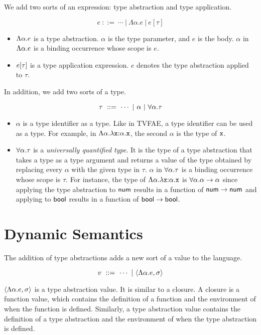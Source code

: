 We add two sorts of an expression: type abstraction and type application.

\[ e\ ::=\ \cdots \ |\ \Lambda\alpha.e \ |\ e[\tau] \]

\begin{itemize}
  \item $\Lambda\alpha.e$ is a type abstraction. $\alpha$ is the type
    parameter, and $e$ is the body. $\alpha$ in $\Lambda\alpha.e$
    is a binding occurrence whose scope is $e$.
  \item $e[\tau]$ is a type application expression. $e$ denotes the type
    abstraction applied to $\tau$.
\end{itemize}

In addition, we add two sorts of a type.

\[ \tau\ ::=\ \cdots \ |\ \alpha \ |\ \tforall{\alpha}{\tau} \]

\begin{itemize}
  \item $\alpha$ is a type identifier as a type. Like in \textsf{TVFAE}, a
    type identifier can be used as a type.
    For example, in $\Lambda\alpha.\lambda\texttt{x}{:}\alpha.\texttt{x}$, the second
    $\alpha$ is the type of $\texttt{x}$.
  \item $\forall\alpha.\tau$ is a \textit{universally quantified
    type}. It is the type of a type
    abstraction that takes a type as a type argument and returns a value of the type
    obtained by replacing every $\alpha$ with the given type in $\tau$.
    $\alpha$ in $\forall\alpha.\tau$ is a binding occurrence whose scope is
    $\tau$.
    For instance, the type of $\Lambda\alpha.\lambda\texttt{x}{:}\alpha.\texttt{x}$ is
    $\forall\alpha.\alpha\rightarrow\alpha$ since applying the type
    abstraction to $\textsf{num}$ results in a function of $\textsf{num}\rightarrow\textsf{num}$ and
    applying to $\textsf{bool}$ results in a function of $\textsf{bool}\rightarrow\textsf{bool}$.
\end{itemize}

\section{Dynamic Semantics}

The addition of type abstractions adds a new sort of a value to the language.

\[ v\ ::=\ \cdots \ |\ \tclov{\alpha}{e}{\sigma} \]

$\langle\Lambda\alpha.e,\sigma\rangle$ is a type abstraction value. It is similar to a
closure. A closure is a function value, which contains the definition of a
function and the environment of when the function is defined. Similarly, a type
abstraction value contains the definition of a type abstraction and the
environment of when the type abstraction is defined.

